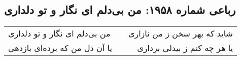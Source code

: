 \begin{center}
\section*{رباعی شماره ۱۹۵۸: من بی‌دلم ای نگار و تو دلداری}
\label{sec:1958}
\begin{longtable}{l p{0.5cm} r}
من بی‌دلم ای نگار و تو دلداری
&&
شاید که بهر سخن ز من نازاری
\\
یا آن دل من که برده‌ای بازدهی
&&
یا هر چه کنم ز بیدلی برداری
\\
\end{longtable}
\end{center}
